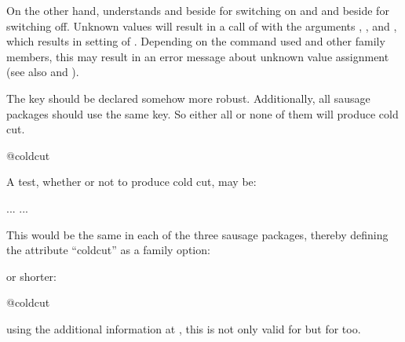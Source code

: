 On the other hand,  understands  
and  beside  for switching on and  and
 beside  for switching off. Unknown values will result
in a call of  with the arguments ,
, and , which results in setting of
. Depending on the command used and other family
members, this may result in an error message about unknown value assignment
(see also  and
).
\begin{Example}
  The key  should be declared somehow more
  robust. Additionally, all sausage packages should use the same key. So
  either all or none of them will produce cold cut.
\begin{lstcode}
                         {@coldcut}
\end{lstcode}
  A test, whether or not to produce cold cut, may be:
\begin{lstcode}
  \if@coldcut
     ...
  \else
     ...
  \fi
\end{lstcode}
  This would be the same in each of the three sausage packages, thereby
  defining the attribute ``coldcut'' as a family option:
  or shorter:
\begin{lstcode}
                           {@coldcut}
\end{lstcode}
  using the additional information at
  , this is not only valid
  for  but for  too.
\end{Example}
%
%


